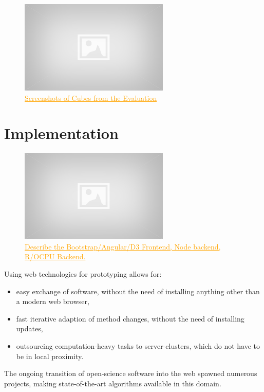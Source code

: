 \documentclass[journal]{style/vgtc} 			          %
\newcommand{\com}[1]{\textcolor{orange}{\uline{#1}}}
\begin{document}

\begin{figure}[htb]
 \centering
 \includegraphics[width=2.8in]{figures/placeholder}
 \caption{
 \com{Screenshots of Cubes from the Evaluation}
 }
  \label{fig:comparison}
\end{figure}

\section{Implementation} \label{implementation}
\begin{figure}[htb]
 \centering
 \includegraphics[width=2.8in]{figures/placeholder}
 \caption{
 \com{Describe the Bootstrap/Angular/D3 Frontend, Node backend, R/OCPU Backend.}
 }
  \label{fig:Implementation}
\end{figure}
Using web technologies for prototyping allows for:
\begin{itemize}
	\item easy exchange of software, without the need of installing anything other than a modern web browser,
	\item fast iterative adaption of method changes, without the need of installing updates,
	\item outsourcing computation-heavy tasks to server-clusters, which do not have to be in local proximity.
\end{itemize}
The ongoing transition of open-science software into the web spawned numerous projects, making state-of-the-art algorithms available in this domain.
\end{document}
